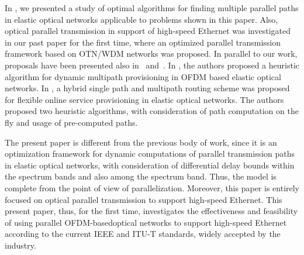 \documentclass[conference]{IEEEtran}
\begin{document}
\par In \cite{Chen:infocom:2013}, we presented a study of optimal algorithms for finding multiple parallel paths in elastic optical networks applicable to problems shown in this paper.   Also, optical parallel transmission  in support of high-speed Ethernet was investigated in our past paper \cite{Chen:JOCN:2012} for the first time, where an optimized parallel transmission framework based on OTN/WDM networks was proposed. In parallel to our work, proposals have been presented also in~\cite{Lu:Letter:2012} and~\cite{Zhu:JLT:2013}.    In \cite{Lu:Letter:2012}, the authors proposed a heuristic algorithm for dynamic multipath provisioning in OFDM based elastic optical networks. In \cite{Zhu:JLT:2013}, a hybrid single path and multipath routing scheme  was proposed for flexible online service provisioning in elastic optical networks. The authors proposed two heuristic algorithms, with consideration of path computation on the fly and usage of pre-computed paths.
\par The present paper is different from the previous body of work, since it is an optimization framework for dynamic computations of parallel transmission paths in elastic optical networks, with consideration of differential delay bounds within the spectrum bands and also among the spectrum band. Thus, the model is complete from the point of view of parallelization.
Moreover, this paper is entirely focused on optical parallel transmission to support high-speed Ethernet.  This present paper, thus, for the first time, investigates the effectiveness and feasibility of using parallel OFDM-basedoptical networks to support high-speed Ethernet according to the current IEEE and ITU-T standards, widely accepted by the industry. 
\end{document}
